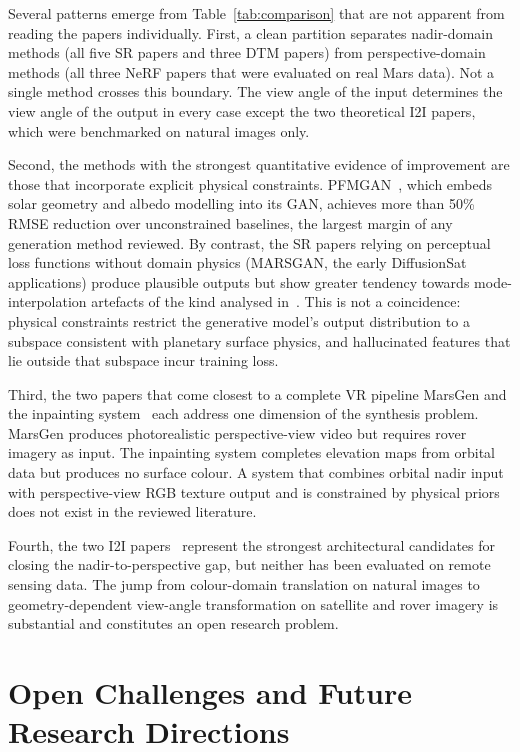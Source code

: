 \documentclass[10pt,journal]{IEEEtran}
\begin{document}
Several patterns emerge from Table~\ref{tab:comparison} that are not apparent
from reading the papers individually. First, a clean partition separates
nadir-domain methods (all five SR papers and three DTM papers) from
perspective-domain methods (all three NeRF papers that were evaluated on real
Mars data). Not a single method crosses this boundary. The view angle of the
input determines the view angle of the output in every case except the two
theoretical I2I papers, which were benchmarked on natural images only.

Second, the methods with the strongest quantitative evidence of improvement
are those that incorporate explicit physical constraints. PFMGAN~\cite{zou2026pfmgan},
which embeds solar geometry and albedo modelling into its GAN, achieves more
than 50\% RMSE reduction over unconstrained baselines, the largest margin of any
generation method reviewed. By contrast, the SR papers relying on perceptual loss
functions without domain physics (MARSGAN, the early DiffusionSat applications)
produce plausible outputs but show greater tendency towards mode-interpolation
artefacts of the kind analysed in~\cite{aithal2024hallucination}. This is not a
coincidence: physical constraints restrict the generative model's output
distribution to a subspace consistent with planetary surface physics, and
hallucinated features that lie outside that subspace incur training loss.

Third, the two papers that come closest to a complete VR pipeline MarsGen
\cite{li2025martian} and the inpainting
system~\cite{catalano2025inpainting} each address one dimension of the
synthesis problem. MarsGen produces photorealistic perspective-view video but
requires rover imagery as input. The inpainting system completes elevation maps
from orbital data but produces no surface colour. A system that combines
orbital nadir input with perspective-view RGB texture output and is constrained
by physical priors does not exist in the reviewed literature.

Fourth, the two I2I papers~\cite{kim2024unsb, xiao2025brownian} represent the
strongest architectural candidates for closing the nadir-to-perspective gap,
but neither has been evaluated on remote sensing data. The jump from colour-domain
translation on natural images to geometry-dependent view-angle transformation on
satellite and rover imagery is substantial and constitutes an open research
problem.

\section{Open Challenges and Future Research Directions}
\label{sec:challenges}
\end{document}
